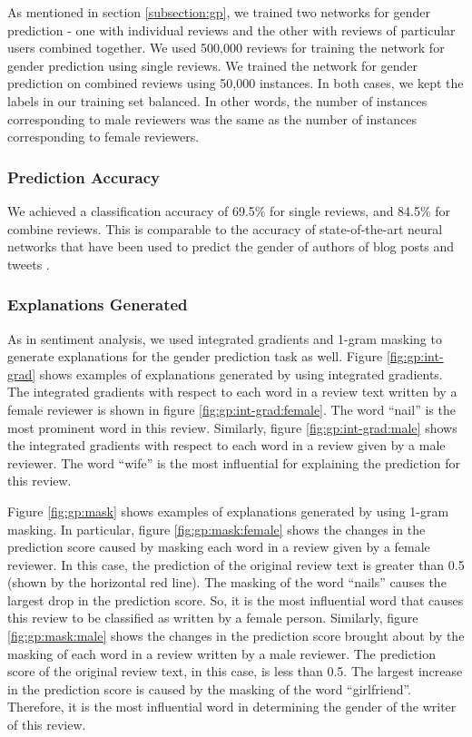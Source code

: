  As mentioned in section \ref{subsection:gp}, we trained two networks for gender prediction - one with individual reviews and the other with reviews of particular users combined together. We used 500,000 reviews for training the network for gender prediction using single reviews. We trained the network for gender prediction on combined reviews using 50,000 instances. In both cases, we kept the labels in our training set balanced. In other words, the number of instances corresponding to male reviewers was the same as the number of instances corresponding to female reviewers.

\subsubsection{Prediction Accuracy}

We achieved a classification accuracy of 69.5\% for single reviews, and 84.5\% for combine reviews. This is comparable to the accuracy of state-of-the-art neural networks that have been used to predict the gender of authors of blog posts and tweets \cite{Burger2011, Mukherjee2010}.

\subsubsection{Explanations Generated}

As in sentiment analysis, we used integrated gradients and 1-gram masking to generate explanations for the gender prediction task as well. Figure \ref{fig:gp:int-grad} shows examples of explanations generated by using integrated gradients. The integrated gradients with respect to each word in a review text written by a female reviewer is shown in figure \ref{fig:gp:int-grad:female}. The word ``nail'' is the most prominent word in this review. Similarly, figure \ref{fig:gp:int-grad:male} shows the integrated gradients with respect to each word in a review given by a male reviewer. The word ``wife'' is the most influential for explaining the prediction for this review.

Figure \ref{fig:gp:mask} shows examples of explanations generated by using 1-gram masking. In particular, figure \ref{fig:gp:mask:female} shows the changes in the prediction score caused by masking each word in a review given by a female reviewer. In this case, the prediction of the original review text is greater than 0.5 (shown by the horizontal red line). The masking of the word ``nails'' causes the largest drop in the prediction score. So, it is the most influential word that causes this review to be classified as written by a female person. Similarly, figure \ref{fig:gp:mask:male} shows the changes in the prediction score brought about by the masking of each word in a review written by a male reviewer. The prediction score of the original review text, in this case, is less than 0.5. The largest increase in the prediction score is caused by the masking of the word ``girlfriend''. Therefore, it is the most influential word in determining the gender of the writer of this review.

